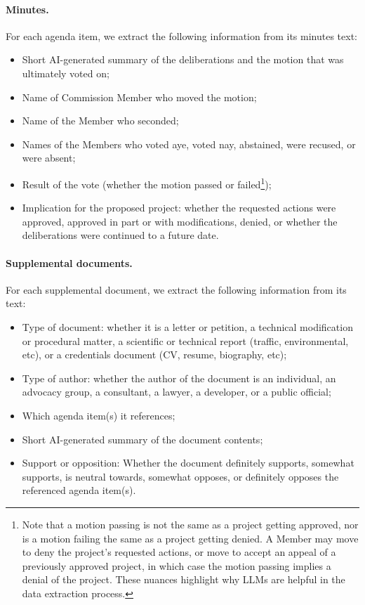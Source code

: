 \paragraph{Minutes.} For each agenda item, we extract the following information from its minutes text:
\begin{itemize}[noitemsep, topsep=0pt]
\item Short AI-generated summary of the deliberations and the motion that was ultimately voted on;
\item Name of Commission Member who moved the motion;
\item Name of the Member who seconded;
\item Names of the Members who voted aye, voted nay, abstained, were recused, or were absent;
\item Result of the vote (whether the motion passed or failed\footnote{Note that a motion passing is not the same as a project getting approved, nor is a motion failing the same as a project getting denied. A Member may move to deny the project's requested actions, or move to accept an appeal of a previously approved project, in which case the motion passing implies a denial of the project. These nuances highlight why LLMs are helpful in the data extraction process.});
\item Implication for the proposed project: whether the requested actions were approved, approved in part or with modifications, denied, or whether the deliberations were continued to a future date.
\end{itemize}

\paragraph{Supplemental documents.} For each supplemental document, we extract the following information from its text:
\begin{itemize}[noitemsep, topsep=0pt]
\item Type of document: whether it is a letter or petition, a technical modification or procedural matter, a scientific or technical report (traffic, environmental, etc), or a credentials document (CV, resume, biography, etc); 
\item Type of author: whether the author of the document is an individual, an advocacy group, a consultant, a lawyer, a developer, or a public official;
\item Which agenda item(s) it references;
\item Short AI-generated summary of the document contents;
\item Support or opposition: Whether the document definitely supports, somewhat supports, is neutral towards, somewhat opposes, or definitely opposes the referenced agenda item(s).
\end{itemize}

